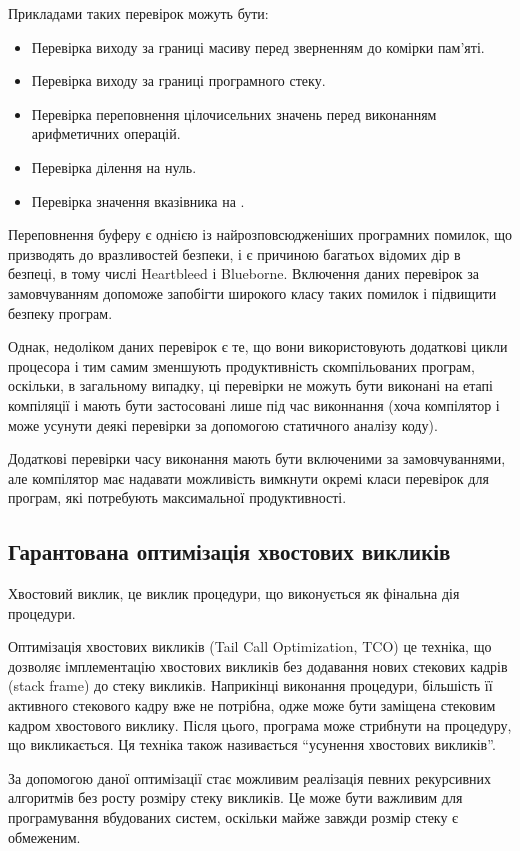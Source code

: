 \documentclass[main.tex]{subfiles}
\begin{document}
Прикладами таких перевірок можуть бути:
\begin{itemize}[nosep]
\item Перевірка виходу за границі масиву перед зверненням до комірки пам'яті.
\item Перевірка виходу за границі програмного стеку.
\item Перевірка переповнення цілочисельних значень перед виконанням арифметичних операцій.
\item Перевірка ділення на нуль.
\item Перевірка значення вказівника на .
\end{itemize}

Переповнення буферу є однією із найрозповсюдженіших програмних помилок, що призводять до вразливостей безпеки, і є причиною багатьох відомих дір в безпеці, в тому числі Heartbleed\cite{heartbleed} і Blueborne\cite{blueborne}.
Включення даних перевірок за замовчуванням допоможе запобігти широкого класу таких помилок і підвищити безпеку програм.

Однак, недоліком даних перевірок є те, що вони використовують додаткові цикли процесора і тим самим зменшують продуктивність скомпільованих програм, оскільки, в загальному випадку, ці перевірки не можуть бути виконані на етапі компіляції і мають бути застосовані лише під час виконнання (хоча компілятор і може усунути деякі перевірки за допомогою статичного аналізу коду).

Додаткові перевірки часу виконання мають бути включеними за замовчуваннями, але компілятор має надавати можливість вимкнути окремі класи перевірок для програм, які потребують максимальної продуктивності.

\subsection{Гарантована оптимізація хвостових викликів}
Хвостовий виклик, це виклик процедури, що виконується як фінальна дія процедури.

Оптимізація хвостових викликів (Tail Call Optimization, TCO) це техніка, що дозволяє імплементацію хвостових викликів без додавання нових стекових кадрів (stack frame) до стеку викликів. Наприкінці виконання процедури, більшість її активного стекового кадру вже не потрібна, одже може бути заміщена стековим кадром хвостового виклику. Після цього, програма може стрибнути на процедуру, що викликається. Ця техніка також називається ``усунення хвостових викликів''.

За допомогою даної оптимізації стає можливим реалізація певних рекурсивних алгоритмів без росту розміру стеку викликів.
Це може бути важливим для програмування вбудованих систем, оскільки майже завжди розмір стеку є обмеженим.
\end{document}
